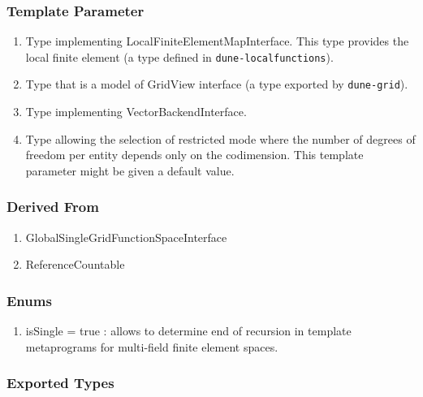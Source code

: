 \documentclass[11pt,a4paper,DIV11,%
notitlepage,oneside,abstracton,%
bibtotoc]{scrartcl}
\begin{document}
\subsubsection{Template Parameter}

\begin{enumerate}[1)]
\item Type implementing LocalFiniteElementMapInterface. This
  type provides the local finite element (a type defined in
  \lstinline|dune-localfunctions|). 
\item Type that is a model of GridView interface (a type exported
  by \lstinline|dune-grid|). 
\item Type implementing VectorBackendInterface.
\item Type allowing the selection of restricted mode where the number
  of degrees of freedom per entity depends only on the
  codimension. This template parameter might be given a default value.
\end{enumerate}

\subsubsection{Derived From}

\begin{enumerate}[1)]
\item GlobalSingleGridFunctionSpaceInterface
\item ReferenceCountable
\end{enumerate}


\subsubsection{Enums}

\begin{enumerate}[1)]
\item isSingle = true : allows to determine end of recursion in
  template metaprograms for multi-field finite element spaces.
\end{enumerate}

\subsubsection{Exported Types}
\end{document}
